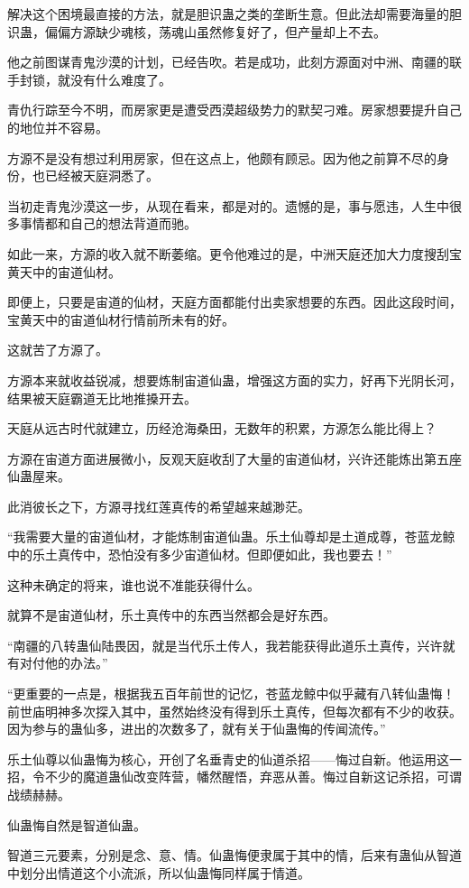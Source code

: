\begin{this_body}
解决这个困境最直接的方法，就是胆识蛊之类的垄断生意。但此法却需要海量的胆识蛊，偏偏方源缺少魂核，荡魂山虽然修复好了，但产量却上不去。

他之前图谋青鬼沙漠的计划，已经告吹。若是成功，此刻方源面对中洲、南疆的联手封锁，就没有什么难度了。

青仇行踪至今不明，而房家更是遭受西漠超级势力的默契刁难。房家想要提升自己的地位并不容易。

方源不是没有想过利用房家，但在这点上，他颇有顾忌。因为他之前算不尽的身份，也已经被天庭洞悉了。

当初走青鬼沙漠这一步，从现在看来，都是对的。遗憾的是，事与愿违，人生中很多事情都和自己的想法背道而驰。

如此一来，方源的收入就不断萎缩。更令他难过的是，中洲天庭还加大力度搜刮宝黄天中的宙道仙材。

即便上，只要是宙道的仙材，天庭方面都能付出卖家想要的东西。因此这段时间，宝黄天中的宙道仙材行情前所未有的好。

这就苦了方源了。

方源本来就收益锐减，想要炼制宙道仙蛊，增强这方面的实力，好再下光阴长河，结果被天庭霸道无比地推搡开去。

天庭从远古时代就建立，历经沧海桑田，无数年的积累，方源怎么能比得上？

方源在宙道方面进展微小，反观天庭收刮了大量的宙道仙材，兴许还能炼出第五座仙蛊屋来。

此消彼长之下，方源寻找红莲真传的希望越来越渺茫。

“我需要大量的宙道仙材，才能炼制宙道仙蛊。乐土仙尊却是土道成尊，苍蓝龙鲸中的乐土真传中，恐怕没有多少宙道仙材。但即便如此，我也要去！”

这种未确定的将来，谁也说不准能获得什么。

就算不是宙道仙材，乐土真传中的东西当然都会是好东西。

“南疆的八转蛊仙陆畏因，就是当代乐土传人，我若能获得此道乐土真传，兴许就有对付他的办法。”

“更重要的一点是，根据我五百年前世的记忆，苍蓝龙鲸中似乎藏有八转仙蛊悔！前世庙明神多次探入其中，虽然始终没有得到乐土真传，但每次都有不少的收获。因为参与的蛊仙多，进出的次数多了，就有关于仙蛊悔的传闻流传。”

乐土仙尊以仙蛊悔为核心，开创了名垂青史的仙道杀招——悔过自新。他运用这一招，令不少的魔道蛊仙改变阵营，幡然醒悟，弃恶从善。悔过自新这记杀招，可谓战绩赫赫。

仙蛊悔自然是智道仙蛊。

智道三元要素，分别是念、意、情。仙蛊悔便隶属于其中的情，后来有蛊仙从智道中划分出情道这个小流派，所以仙蛊悔同样属于情道。


\end{this_body}
